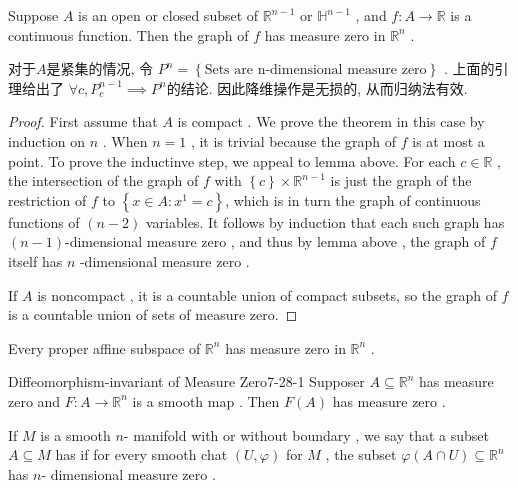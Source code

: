 \documentclass[../main.tex]{subfiles}
\begin{document}
\begin{proposition}{}{}
    Suppose \(  A  \) is an open or closed subset of \(  \mathbb{R} ^{n-1}  \) or \(  \mathbb{H}^{n-1}  \) , and \(  f: A\to \mathbb{R}   \) is a continuous function. Then the graph of \(  f  \) has measure zero in \(  \mathbb{R} ^{n}  \) .       
\end{proposition}
\begin{proofsketch}
    对于\(  A  \)是紧集的情况, 令 \(  P^{n}= \left\{\text{Sets are n-dimensional measure zero}  \right\}  \) .  上面的引理给出了 \(  \forall c, P_{c}^{n-1} \implies  P^{n}  \)的结论.  因此降维操作是无损的, 从而归纳法有效. 
\end{proofsketch}
\begin{proof}
    First assume that \(  A  \) is compact .  We prove the theorem in this case by induction on \(  n   \) . When \(  n = 1  \) , it is trivial because the graph of \(  f  \) is at most a point.  To prove the inductinve step, we appeal to lemma above. For each \(  c \in \mathbb{R}   \) , the intersection of the graph of \(  f  \) with \(  \left\{ c \right\}\times \mathbb{R} ^{n-1}  \) is just the graph of the restriction of \(  f  \) to \(  \left\{  x \in A:x^{1}= c \right\}  \),     which is in turn the graph of continuous functions of \(  \left( n-2 \right)   \) variables. It follows by induction that each such graph has \(  \left( n-1 \right)   \)-dimensional measure zero , and thus by lemma above , the graph of \(  f  \) itself has \(  n  \) -dimensional measure zero . 

    If \(  A  \) is noncompact , it is a  countable union of compact subsets, so the graph of \(  f  \) is a countable union of sets of measure zero.  
\end{proof}

\begin{corollary}{}{}
    Every proper affine subspace of \(  \mathbb{R} ^{n}  \) has measure zero in \(  \mathbb{R} ^{n}  \) .   
\end{corollary}

\begin{proposition}{Diffeomorphism-invariant of Measure Zero}{7-28-1}
    Supposer \(  A\subseteq \mathbb{R} ^{n}  \) has measure zero and \(  F: A\to \mathbb{R} ^{n}  \) is a smooth map . Then \(  F\left( A \right)   \) has measure zero .    
\end{proposition}

\begin{definition}{}{}
    If  \(  M  \) is a smooth \(  n  \)- manifold with or without boundary , we say that a subset \(  A\subseteq M  \) has  if for every smooth chat \(  \left( U, \varphi  \right)   \) for \(  M  \) , the subset \(   \varphi \left( A\cap U \right)\subseteq \mathbb{R} ^{n}   \) has \(  n  \)- dimensional measure zero .        
\end{definition}
\end{document}
